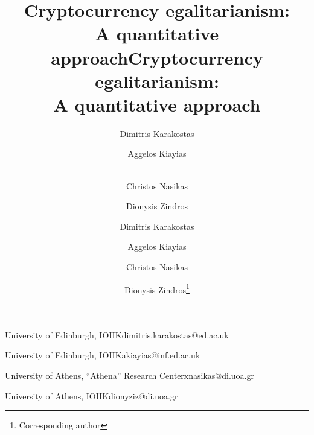 
\iflncs
\title{Cryptocurrency egalitarianism:\\A quantitative approach}
\else
\title{Cryptocurrency egalitarianism:\protect\\A quantitative approach} %

\fi

\ifanonymous
   \author{}
   \iflncs
     \institute{}
   \fi
\else
  \iflncs
     \author{
             Dimitris Karakostas  \and
             Aggelos Kiayias  \and\\
             Christos Nasikas  \and
             Dionysis Zindros 
     }
 \else
    \author{Dimitris Karakostas}{University of Edinburgh, IOHK}{dimitris.karakostas@ed.ac.uk}{}{}%

    \author{Aggelos Kiayias}{University of Edinburgh, IOHK}{akiayias@inf.ed.ac.uk}{}{}
    \author{Christos Nasikas}{University of Athens, ``Athena'' Research Center}{xnasikas@di.uoa.gr}{}{}
    \author{Dionysis Zindros\footnote{Corresponding author}}{University of Athens, IOHK}{dionyziz@di.uoa.gr}{}{}

  \fi
\fi
\iflncs
  \maketitle
\fi
